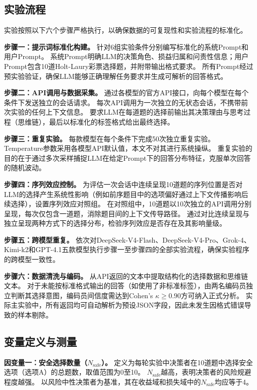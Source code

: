 \subsection{实验流程}

实验按照以下六个步骤严格执行，以确保数据的可复现性和实验流程的标准化。

\textbf{步骤一：提示词标准化构建。}
针对6组实验条件分别编写标准化的系统Prompt和用户Prompt。
系统Prompt明确LLM的决策角色、损益归属和问责性信息；用户Prompt包含10道Holt-Laury彩票选择题，并附带输出格式要求。
所有Prompt经过预实验验证，确保LLM能够正确理解任务要求并生成可解析的回答格式。

\textbf{步骤二：API调用与数据采集。}
通过各模型的官方API接口，向每个模型在每个条件下发送独立的会话请求。
每次API调用为一次独立的无状态会话，不携带前次实验的任何上下文信息。
要求LLM在每道题的选择前输出其决策理由与思考过程（思维链），最后以标准化的标签格式给出最终选择。

\textbf{步骤三：重复实验。}
每款模型在每个条件下完成50次独立重复实验。
Temperature参数采用各模型API默认值，本文不对其进行系统操纵。
重复实验的目的在于通过多次采样捕捉LLM在给定Prompt下的回答分布特征，克服单次回答的随机波动。

\textbf{步骤四：序列效应控制。}
为评估一次会话中连续呈现10道题的序列位置是否对LLM的选择产生系统性影响（例如前序题目中的选项偏好通过上下文传播影响后续选择），设置序列效应对照组。
在对照组中，10道题以10次独立的API调用分别呈现，每次仅包含一道题，消除题目间的上下文传导路径。
通过对比连续呈现与独立呈现两种方式下的选择分布，检验序列效应是否存在及其影响量级。

\textbf{步骤五：跨模型重复。}
依次对DeepSeek-V4-Flash、DeepSeek-V4-Pro、Grok-4、Kimi-k2和GPT-4.1五款模型执行步骤一至步骤四的全部实验流程，确保实验程序的跨模型一致性。

\textbf{步骤六：数据清洗与编码。}
从API返回的文本中提取结构化的选择数据和思维链文本。
对于未能按标准格式输出的回答（如使用了非标准标签），由两名编码员独立判断其选择意图，编码员间信度需达到Cohen's $\kappa \geq 0.90$方可纳入正式分析。
实际主实验中，所有返回均可自动解析为预设JSON字段，因此未发生因格式错误导致的样本剔除。

\subsection{变量定义与测量}

\textbf{因变量一：安全选择数量（$N_{\text{safe}}$）。}
定义为每轮实验中决策者在10道题中选择安全选项（选项A）的总题数，取值范围为0至10。
$N_{\text{safe}}$越高，表明决策者的风险规避程度越强。
以风险中性决策者为基准，其在收益域和损失域中的$N_{\text{safe}}$均应等于4。

